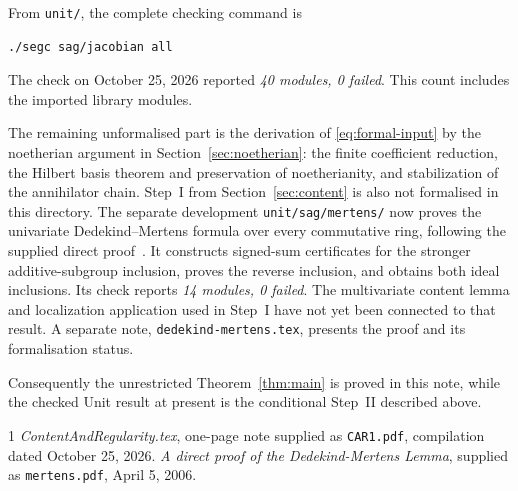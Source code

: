 \documentclass[11pt]{amsart}
\theoremstyle{definition}
\theoremstyle{remark}
\newcommand{\code}[1]{\texttt{#1}}
\begin{document}
From \code{unit/}, the complete checking command is
\begin{verbatim}
./segc sag/jacobian all
\end{verbatim}
The check on October 25, 2026 reported \emph{40 modules, 0 failed}.
This count includes the imported library modules.

The remaining unformalised part is the derivation of
\eqref{eq:formal-input} by the noetherian argument in
Section~\ref{sec:noetherian}: the finite coefficient reduction, the
Hilbert basis theorem and preservation of noetherianity, and stabilization
of the annihilator chain. Step~I from Section~\ref{sec:content} is also
not formalised in this directory. The separate development
\code{unit/sag/mertens/} now proves the univariate Dedekind--Mertens
formula over every commutative ring, following the supplied direct
proof~\cite{Mertens}. It constructs signed-sum certificates for the
stronger additive-subgroup inclusion, proves the reverse inclusion,
and obtains both ideal inclusions. Its check reports
\emph{14 modules, 0 failed}. The multivariate content lemma and
localization application used in Step~I have not yet been connected
to that result. A separate note, \code{dedekind-mertens.tex}, presents
the proof and its formalisation status.

Consequently the unrestricted
Theorem~\ref{thm:main} is proved in this note, while the checked Unit
result at present is the conditional Step~II described above.

\begin{thebibliography}{1}
\emph{ContentAndRegularity.tex}, one-page note supplied as
\code{CAR1.pdf}, compilation dated October 25, 2026.
\emph{A direct proof of the Dedekind-Mertens Lemma}, supplied as
\code{mertens.pdf}, April 5, 2006.
\end{thebibliography}
\end{document}
